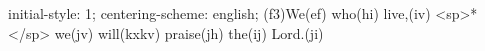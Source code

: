 initial-style: 1;
centering-scheme: english;
(f3)We(ef) who(hi) live,(iv) <sp>*</sp> we(jv) will(kxkv) praise(jh) the(ij) Lord.(ji)
